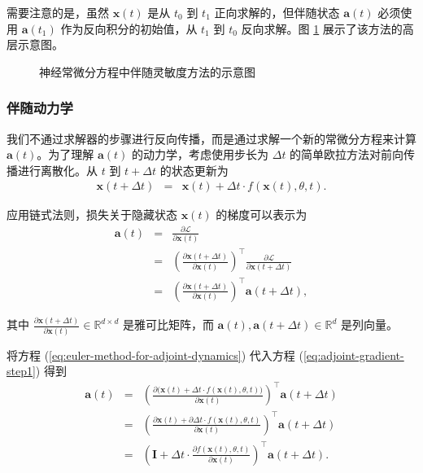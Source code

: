\documentclass[UTF8,a4paper,zihao=-4,oneside,openany]{ctexbook}
\makeatletter
\newcommand{\AMLFigure}[2][0.96\linewidth]{%
  \begingroup
  \let\AtBeginDocument\@gobble
  \endgroup
}
\makeatother
\begin{document}
需要注意的是，虽然 $\mathbf{x}(t)$ 是从 $t_0$ 到 $t_1$ 正向求解的，但伴随状态 $\mathbf{a}(t)$ 必须使用 $\mathbf{a}(t_1)$ 作为反向积分的初始值，从 $t_1$ 到 $t_0$ 反向求解。图 \ref{fig:adjoint-sensitivity-method} 展示了该方法的高层示意图。

\begin{figure}[!t]
\centering
\AMLFigure{figure-adjoint-sensitivity-method}
\caption{神经常微分方程中伴随灵敏度方法的示意图
}
\label{fig:adjoint-sensitivity-method}
\end{figure}
\subsubsection{伴随动力学}

我们不通过求解器的步骤进行反向传播，而是通过求解一个新的常微分方程来计算 $\mathbf{a}(t)$。为了理解 $\mathbf{a}(t)$ 的动力学，考虑使用步长为 $\Delta t$ 的简单欧拉方法对前向传播进行离散化。从 $t$ 到 $t+\Delta t$ 的状态更新为
\begin{eqnarray}
\mathbf{x}(t+\Delta t) & = & \mathbf{x}(t) + \Delta t \cdot f(\mathbf{x}(t), \theta, t). \label{eq:euler-method-for-adjoint-dynamics}
\end{eqnarray}

应用链式法则，损失关于隐藏状态 $\mathbf{x}(t)$ 的梯度可以表示为
\begin{eqnarray}
\mathbf{a}(t) & = & \frac{\partial \mathcal{L}}{\partial \mathbf{x}(t)} \nonumber \\
& = & \left( \frac{\partial \mathbf{x}(t+\Delta t)}{\partial \mathbf{x}(t)} \right)^\top \frac{\partial \mathcal{L}}{\partial \mathbf{x}(t+\Delta t)} \nonumber \\
& = & \left( \frac{\partial \mathbf{x}(t+\Delta t)}{\partial \mathbf{x}(t)} \right)^\top \mathbf{a}(t+\Delta t), \label{eq:adjoint-gradient-step1}
\end{eqnarray}

\noindent 其中 $\frac{\partial \mathbf{x}(t+\Delta t)}{\partial \mathbf{x}(t)} \in \mathbb{R}^{d \times d}$ 是雅可比矩阵，而 $\mathbf{a}(t), \mathbf{a}(t+\Delta t) \in \mathbb{R}^{d}$ 是列向量。

将方程 (\ref{eq:euler-method-for-adjoint-dynamics}) 代入方程 (\ref{eq:adjoint-gradient-step1}) 得到
\begin{eqnarray}
\mathbf{a}(t) & = & \left( \frac{\partial \big( \mathbf{x}(t) + \Delta t \cdot f(\mathbf{x}(t), \theta, t) \big)}{\partial \mathbf{x}(t)} \right)^\top \mathbf{a}(t+\Delta t) \nonumber \\
& = & \left( \frac{\partial \mathbf{x}(t) + \partial \Delta t \cdot f(\mathbf{x}(t), \theta, t) }{\partial \mathbf{x}(t)} \right)^\top \mathbf{a}(t+\Delta t) \nonumber \\
& = &  \left( \mathbf{I} + \Delta t \cdot \frac{\partial f(\mathbf{x}(t), \theta, t)}{\partial \mathbf{x}(t)} \right)^\top \mathbf{a}(t+\Delta t).
\end{eqnarray}
\end{document}
